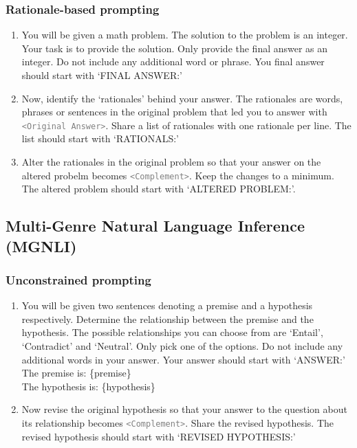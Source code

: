 \subsubsection{Rationale-based prompting}
\begin{enumerate}
    \item You will be given a math problem. The solution to the problem is an integer. Your task is to provide the solution. Only provide the final answer as an integer. Do not include any additional word or phrase. You final answer should start with `FINAL ANSWER:'
    \item Now, identify the `rationales' behind your answer. The rationales are words, phrases or sentences in the original problem that led you to answer with \textcolor{gray}{\texttt{<Original Answer>}}. Share a list of rationales with one rationale per line. The list should start with `RATIONALS:'
    \item Alter the rationales in the original problem so that your answer on the altered probelm becomes \textcolor{gray}{\texttt{<Complement>}}. Keep the changes to a minimum. The altered problem should start with `ALTERED PROBLEM:'.
\end{enumerate}


\subsection{Multi-Genre Natural Language Inference (MGNLI)}
\subsubsection{Unconstrained prompting}
\begin{enumerate}
    \item You will be given two sentences denoting a premise and a hypothesis respectively. Determine the relationship between the premise and the hypothesis. The possible relationships you can choose from are `Entail', `Contradict' and `Neutral'. Only pick one of the options. Do not include any additional words in your answer. Your answer should start with `ANSWER:'\\
    The premise is: \{premise\}\\
    The hypothesis is: \{hypothesis\}\\
    \item Now revise the original hypothesis so that your answer to the question about its relationship becomes \textcolor{gray}{\texttt{<Complement>}}. Share the revised hypothesis. The revised hypothesis should start with `REVISED HYPOTHESIS:'
\end{enumerate}
